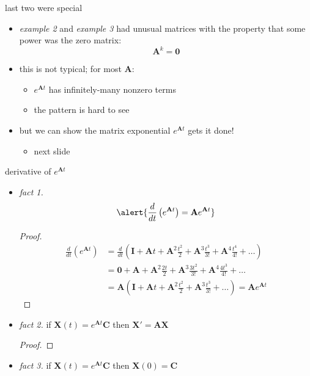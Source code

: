 \documentclass[urlcolor=blue,dvipsnames]{beamer}
\newcommand{\bA}{\mathbf{A}}
\newcommand{\bC}{\mathbf{C}}
\newcommand{\bI}{\mathbf{I}}
\newcommand{\bX}{\mathbf{X}}
\begin{document}
\begin{frame}{last two were special}

\begin{itemize}
\item \emph{example 2} and \emph{example 3} had unusual matrices with the property that some power was the zero matrix:
    $$\bA^k = \mathbf{0}$$
\item this is not typical; for most $\bA$:
    \begin{itemize}
    \item $e^{\bA t}$ has infinitely-many nonzero terms
    \item the pattern is hard to see
    \end{itemize}

\bigskip
\item but we can show the matrix exponential $e^{\bA t}$ gets it done!
    \begin{itemize}
    \item next slide
    \end{itemize}
\end{itemize}
\end{frame}


\begin{frame}{derivative of $e^{\bA t}$}

\begin{itemize}
\item \emph{fact 1.}
    $$\alert{\frac{d}{dt}\left(e^{\bA t}\right) = \bA e^{\bA t}}$$
\small
\begin{proof}

\vspace{-5mm}
\footnotesize
\begin{align*}
\frac{d}{dt}\left(e^{\bA t}\right) &= \frac{d}{dt}\left(\bI + \bA t + \bA^2 \frac{t^2}{2} + \bA^3 \frac{t^3}{3!} + \bA^4 \frac{t^4}{4!} + \dots\right) \\
    &= \mathbf{0} + \bA + \bA^2 \frac{2t}{2} + \bA^3 \frac{3 t^2}{3!} + \bA^4 \frac{4 t^3}{4!} + \dots \\
    &= \bA \left(\bI + \bA t + \bA^2 \frac{t^2}{2} + \bA^3 \frac{t^3}{3!} + \dots\right) = \bA e^{\bA t}
\end{align*}
\end{proof}
\normalsize

\vspace{-5mm}
\item \emph{fact 2.}  if $\bX(t) = e^{\bA t}\bC$ then $\bX'=\bA \bX$
\small
\begin{proof}
\phantom{foo}
\end{proof}
\normalsize
\item \emph{fact 3.}  if $\bX(t) = e^{\bA t}\bC$ then $\bX(0) = \bC$
\end{itemize}
\end{frame}
\end{document}
